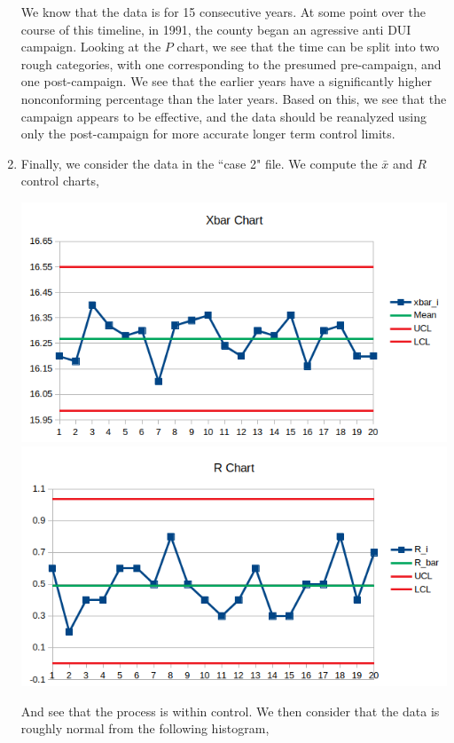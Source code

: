 \documentclass[letterpaper,10pt]{article}
\begin{document}
\begin{enumerate}
\begin{center}
\end{center}
We know that the data is for 15 consecutive years. At some point over the course of this timeline, in 1991, the county began an agressive anti DUI campaign. Looking at the $P$ chart, we see that the time can be split into two rough categories, with one corresponding to the presumed pre-campaign, and one post-campaign. We see that the earlier years have a significantly higher nonconforming percentage than the later years. Based on this, we see that the campaign appears to be effective, and the data should be reanalyzed using only the post-campaign for more accurate longer term control limits.
\item Finally, we consider the data in the ``case 2" file. We compute the $\bar{x}$ and $R$ control charts,
\begin{center}
\includegraphics[scale=1]{3a.png}
\includegraphics[scale=1]{3b.png}
\end{center}
And see that the process is within control. We then consider that the data is roughly normal from the following histogram,
\begin{center}

\end{center}
\end{enumerate}
\end{document}
